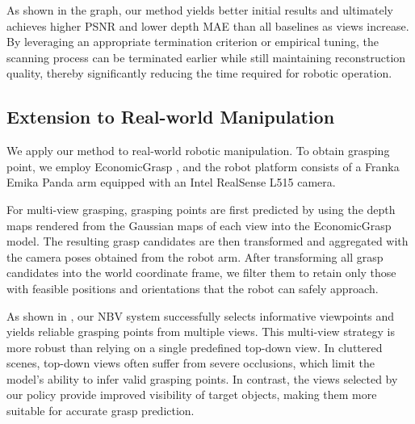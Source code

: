 As shown in the graph, our method yields better initial results and ultimately achieves higher PSNR and lower depth MAE than all baselines as views increase.
By leveraging an appropriate termination criterion or empirical tuning, the scanning process can be terminated earlier while still maintaining reconstruction quality, thereby significantly reducing the time required for robotic operation.



\subsection{Extension to Real-world Manipulation}
We apply our method to real-world robotic manipulation. To obtain grasping point, we employ EconomicGrasp \cite{wu2024economic}, and the robot platform consists of a Franka Emika Panda arm equipped with an Intel RealSense L515 camera.


For multi-view grasping, grasping points are first predicted by using the depth maps rendered from the Gaussian maps of each view into the EconomicGrasp model. The resulting grasp candidates are then transformed and aggregated with the camera poses obtained from the robot arm. After transforming all grasp candidates into the world coordinate frame, we filter them to retain only those with feasible positions and orientations that the robot can safely approach.

As shown in , our NBV system successfully selects informative viewpoints and yields reliable grasping points from multiple views. This multi-view strategy is more robust than relying on a single predefined top-down view. In cluttered scenes, top-down views often suffer from severe occlusions, which limit the model’s ability to infer valid grasping points. In contrast, the views selected by our policy provide improved visibility of target objects, making them more suitable for accurate grasp prediction.

